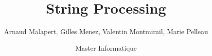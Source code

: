 \documentclass{beamer}
\title{String Processing}
\author[]{Arnaud Malapert, Gilles Menez, Valentin Montmirail, Marie Pelleau}
\date[2018 - 2019]{Master Informatique}
\begin{document}
\frame{
  \titlepage
}
\end{document}
